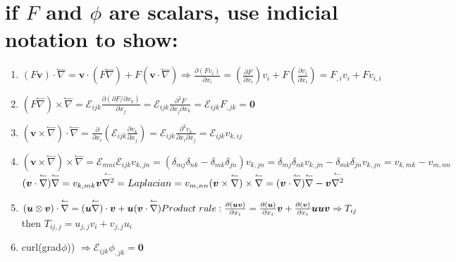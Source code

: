 \documentclass[10pt, letterpaper]{article}
\begin{document}
\section{ if $F$ and $\phi$ are scalars, use indicial  notation to show:}
	\begin{enumerate}[label = (\roman*)]
		\item $(F \bm{v}) \cdot \overset{\leftharpoonup}{\nabla} = \bm{v} \cdot (F\overset{\leftharpoonup}{\nabla}) +
			F(\bm{v} \cdot \overset{\leftharpoonup}{\nabla}) \Rightarrow
			\frac{\partial (F v_i)}{\partial x_i} = \left(\frac{\partial F}{\partial x_i} \right) v_i + 
			 F \left(\frac{\partial v_i}{\partial x_i}\right) = F_{,i}v_i + F v_{i,i}$
			 
		\item $(F \overset{\leftharpoonup}{\nabla}) \times \overset{\leftharpoonup}{\nabla} = 
			\mathcal{E}_{ijk} \frac{\partial \left( \partial F / \partial x_k \right)}{\partial x_j} =
			\mathcal{E}_{ijk} \frac{ \partial^2 F}{\partial x_j \partial x_k} = \mathcal{E}_{ijk} F_{,jk}= \bm{0}$
			
		\item $(\bm{v} \times \overset{\leftharpoonup}{\nabla}) \cdot \overset{\leftharpoonup}{\nabla} = 
			\frac{\partial}{\partial x_i}\left(\mathcal{E}_{ijk} \frac{\partial v_k }{\partial x_j} \right)=
			\mathcal{E}_{ijk} \frac{\partial^2 v_{k}}{\partial x_i \partial x_j} = \mathcal{E}_{ijk} v_{k,ij}$
			
		\item $(\bm{v} \times \overset{\leftharpoonup}{\nabla}) \times \overset{\leftharpoonup}{\nabla} = 
			\mathcal{E}_{mni} \mathcal{E}_{ijk} v_{k,jn} = (\delta_{mj} \delta_{nk} - \delta_{mk} \delta_{jn})v_{k,jn}=
			\delta_{mj} \delta_{nk}v_{k,jn} - \delta_{mk} \delta_{jn}v_{k,jn} = v_{k,mk} - v_{m,nn}$\\
			$(\bm{v} \cdot \overset{\leftharpoonup}{\nabla})\overset{\leftharpoonup}{\nabla} = v_{k,mk} \\
			\bm{v} \overset{\leftharpoonup}{\nabla^2} = Laplacian = v_{m,nn}\\
			(\bm{v} \times \overset{\leftharpoonup}{\nabla}) \times \overset{\leftharpoonup}{\nabla} = 
			(\bm{v} \cdot \overset{\leftharpoonup}{\nabla})\overset{\leftharpoonup}{\nabla} -
			\bm{v} \overset{\leftharpoonup}{\nabla^2} $
			
		\item $(\bm{u} \otimes \bm{v}) \cdot \overset{\leftharpoonup}{\nabla} = 
			(\bm{u} \overset{\leftharpoonup}{\nabla}) \cdot \bm{v} + \bm{u} (\bm{v} \cdot \overset{\leftharpoonup}{\nabla} )\\
			Product \text{ }rule:  \frac{\partial( \bm{u} \bm{v})}{\partial x_i} = 
			\frac{\partial( \bm{u})}{\partial x_i} \bm{v}  + \frac{\partial( \bm{v})}{\partial x_i} \bm{u}\\
			\bm{uv} \Rightarrow T_{ij} \qquad$ then $T_{ij,j} = u_{j,j}v_i + v_{j,j}u_i  
			$ 
		
		\item curl(grad$\phi$)) $\Rightarrow \mathcal{E}_{ijk} \phi_{,jk} = \bm{0} $
						
	\end{enumerate}	
\end{document}
